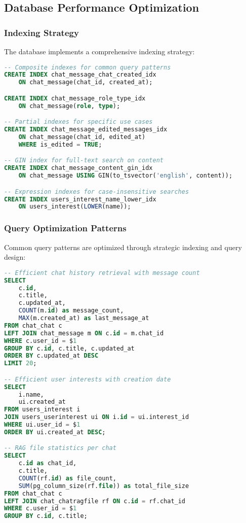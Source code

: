 \documentclass[12pt,a4paper]{article}
\begin{document}
\subsection{Database Performance Optimization}

\subsubsection{Indexing Strategy}

The database implements a comprehensive indexing strategy:

\begin{lstlisting}[language=SQL, caption=Performance Optimization Indexes]
-- Composite indexes for common query patterns
CREATE INDEX chat_message_chat_created_idx 
    ON chat_message(chat_id, created_at);

CREATE INDEX chat_message_role_type_idx 
    ON chat_message(role, type);

-- Partial indexes for specific use cases
CREATE INDEX chat_message_edited_messages_idx 
    ON chat_message(chat_id, edited_at) 
    WHERE is_edited = TRUE;

-- GIN index for full-text search on content
CREATE INDEX chat_message_content_gin_idx 
    ON chat_message USING GIN(to_tsvector('english', content));

-- Expression indexes for case-insensitive searches
CREATE INDEX users_interest_name_lower_idx 
    ON users_interest(LOWER(name));
\end{lstlisting}

\subsubsection{Query Optimization Patterns}

Common query patterns are optimized through strategic indexing and query design:

\begin{lstlisting}[language=SQL, caption=Optimized Query Examples]
-- Efficient chat history retrieval with message count
SELECT 
    c.id,
    c.title,
    c.updated_at,
    COUNT(m.id) as message_count,
    MAX(m.created_at) as last_message_at
FROM chat_chat c
LEFT JOIN chat_message m ON c.id = m.chat_id
WHERE c.user_id = $1
GROUP BY c.id, c.title, c.updated_at
ORDER BY c.updated_at DESC
LIMIT 20;

-- Efficient user interests with creation date
SELECT 
    i.name,
    ui.created_at
FROM users_interest i
JOIN users_userinterest ui ON i.id = ui.interest_id
WHERE ui.user_id = $1
ORDER BY ui.created_at DESC;

-- RAG file statistics per chat
SELECT 
    c.id as chat_id,
    c.title,
    COUNT(rf.id) as file_count,
    SUM(pg_column_size(rf.file)) as total_file_size
FROM chat_chat c
LEFT JOIN chat_chatragfile rf ON c.id = rf.chat_id
WHERE c.user_id = $1
GROUP BY c.id, c.title;
\end{lstlisting}
\end{document}
